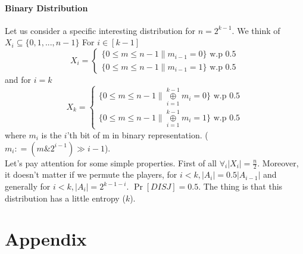 \documentclass{article}
\theoremstyle{plain}
\begin{document}
\paragraph{Binary Distribution}
Let us consider a specific interesting distribution for $n = 2^{k-1}$. We think of $X_i \subseteq \{0, 1, ... , n-1\} $ \newline
For $i \in [k-1]$
  \[
    X_i=\left\{
                \begin{array}{ll}
                  \{0 \leq m \leq n-1 \| m_{i-1} = 0\} \text{ w.p 0.5} \\
                  \{0 \leq m \leq n-1 \| m_{i-1} = 1\} \text{ w.p 0.5}
                \end{array}
              \right.
  \]
and for $i = k$
  \[
    X_k=\left\{
                \begin{array}{ll}
                  \{0 \leq m \leq n-1 \| \underset{i=1}{\overset{k-1}{\oplus}} m_i = 0\} \text{ w.p 0.5} \\
                  \{0 \leq m \leq n-1 \| \underset{i=1}{\overset{k-1}{\oplus}} m_i = 1\} \text{ w.p 0.5}
                \end{array}
              \right.
  \]
where $m_i$ is the $i$'th bit of m in binary representation. ($m_i \mathrel{\mathop:}= ( m \mathop{\&} 2^{i-1} ) \gg i-1 $). \\
Let's pay attention for some simple properties. First of all $\forall_i |X_i| = \frac{n}{2}$. Moreover, it doesn't matter if we permute the players, for $i < k, |A_i| = 0.5|A_{i-1}|$ and generally for $i < k, |A_i| = 2^{k-1-i}$. $\Pr[DISJ] = 0.5$. The thing is that this distribution has a little entropy ($k$).
\section{Appendix}
\end{document}

